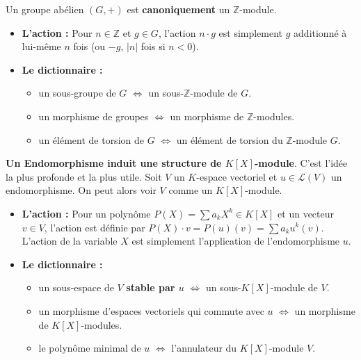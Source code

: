 \begin{example}
    Un groupe abélien $(G,+)$ est \textbf{canoniquement} un $\mathbb{Z}$-module.
    \begin{itemize}
        \item \textbf{L'action :} Pour $n \in \mathbb{Z}$ et $g \in G$, l'action $n \cdot g$ est simplement $g$ additionné à lui-même $n$ fois (ou $-g$, $|n|$ fois si $n<0$).
        \item \textbf{Le dictionnaire :}
        \begin{itemize}
            \item un sous-groupe de $G$ $\iff$ un sous-$\mathbb{Z}$-module de $G$.
            \item un morphisme de groupes $\iff$ un morphisme de $\mathbb{Z}$-modules.
            \item un élément de torsion de $G$ $\iff$ un élément de torsion du $\mathbb{Z}$-module $G$.
        \end{itemize}
    \end{itemize}
\end{example}

\begin{example}
	\textbf{Un Endomorphisme induit une structure de $K[X]$-module}.
    C'est l'idée la plus profonde et la plus utile. Soit $V$ un $K$-espace vectoriel et $u \in \mathcal{L}(V)$ un endomorphisme. On peut alors voir $V$ comme un $K[X]$-module.
    \begin{itemize}
        \item \textbf{L'action :} Pour un polynôme $P(X) = \sum a_k X^k \in K[X]$ et un vecteur $v \in V$, l'action est définie par $P(X) \cdot v = P(u)(v) = \sum a_k u^k(v)$. L'action de la variable $X$ est simplement l'application de l'endomorphisme $u$.
        \item \textbf{Le dictionnaire :}
        \begin{itemize}
            \item un sous-espace de $V$ \textbf{stable par $u$} $\iff$ un sous-$K[X]$-module de $V$.
            \item un morphisme d'espaces vectoriels qui commute avec $u$ $\iff$ un morphisme de $K[X]$-modules.
            \item le polynôme minimal de $u$ $\iff$ l'annulateur du $K[X]$-module $V$.
        \end{itemize}
    \end{itemize}
\end{example}

